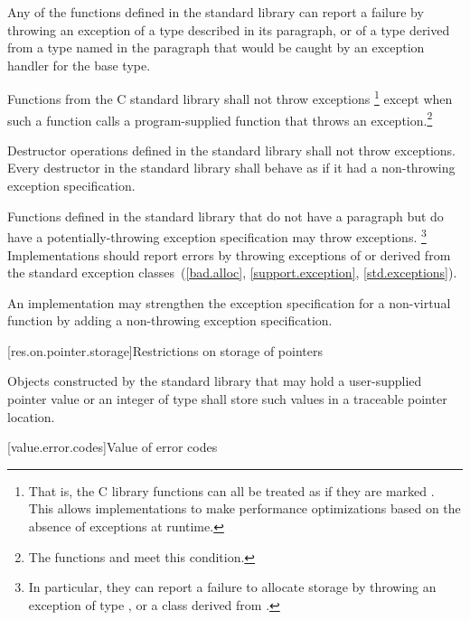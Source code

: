 \pnum
Any of the functions defined in the \Cpp{} standard library
%
can report a failure by throwing an exception of a type
described in its \throws paragraph,
or of a type derived from a type named in the \throws paragraph
that would be caught by an exception handler for the base type.

\pnum
Functions from the C standard library shall not throw exceptions%
\footnote{That is, the C
library functions can all be treated as if they
are marked .
This allows implementations to make performance optimizations
based on the absence of exceptions at runtime.}
except when such a function calls a program-supplied function that throws an
exception.\footnote{The functions
and
 meet this condition.}

\pnum
Destructor operations defined in the \Cpp{} standard library
shall not throw exceptions.
Every destructor in the \Cpp{} standard library shall behave as if it had a
non-throwing exception specification.

\pnum
Functions defined in the
\Cpp{} standard library
%
that do not have a \throws paragraph
but do have a potentially-throwing exception specification
may throw  exceptions.%
\footnote{In particular, they
can report a failure to allocate storage by throwing an exception of type
,
or a class derived from
.}
Implementations should
report errors by throwing exceptions of or derived
from the standard exception classes~(\ref{bad.alloc},
\ref{support.exception}, \ref{std.exceptions}).

\pnum
An implementation may strengthen the
exception specification
for a non-virtual function
by adding a non-throwing exception specification.

[res.on.pointer.storage]{Restrictions on storage of pointers}

\pnum
{}%
%
Objects constructed by the standard library that may hold a user-supplied pointer value
or an integer of type  shall store such values in a traceable
pointer location.

[value.error.codes]{Value of error codes}

